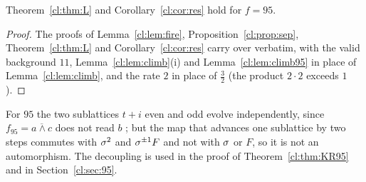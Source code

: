 \begin{corollary}\label{cl:cor:95}
Theorem~\ref{cl:thm:L} and Corollary~\ref{cl:cor:res} hold for $f=95$.
\end{corollary}

\begin{proof}
The proofs of Lemma~\ref{cl:lem:fire}, Proposition~\ref{cl:prop:sep}, Theorem~\ref{cl:thm:L} and Corollary~\ref{cl:cor:res} carry over verbatim, with the valid background $11$, Lemma~\ref{cl:lem:climb}(i) and Lemma~\ref{cl:lem:climb95} in place of Lemma~\ref{cl:lem:climb}, and the rate $2$ in place of $\frac32$ (the product $2\cdot2$ exceeds $1$).
\end{proof}

For $95$ the two sublattices $t+i$ even and odd evolve independently, since $f_{95}=\overline{a\wedge c}$ does not read $b$ \cite[p.~386]{Takesue1989}; but the map that advances one sublattice by two steps commutes with $\sigma^2$ and $\sigma^{\pm1}F$ and not with $\sigma$ or $F$, so it is not an automorphism. The decoupling is used in the proof of Theorem~\ref{cl:thm:KR95} and in Section~\ref{cl:sec:95}.

